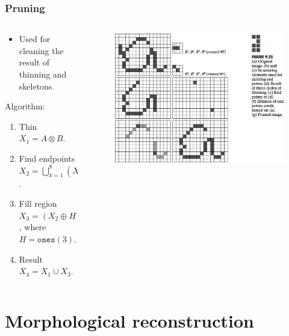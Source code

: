 \begin{frame}
\frametitle{Pruning}
\begin{columns}
\begin{column}{.5\textwidth}
\begin{itemize}
\item Used for cleaning the result of thinning and skeletons.
\end{itemize}
Algorithm:
\begin{enumerate}
\item Thin $X_{1} = A \otimes B$.
\item Find endpoints $X_{2} = \bigcup_{k=1}^{8} (X_{1} \circledast B^{k} )$.
\item Fill region $X_{3} = (X_{2} \oplus H ) \cap A$, where $H = \texttt{ones}(3)$.
\item Result $X_{4} = X_{1} \cup X_{3}$.
\end{enumerate}
\end{column}
\begin{column}{.5\textwidth}
\begin{figure}[!h]
\includegraphics[width=\textwidth]{fig-9-25.png}
\end{figure}
\end{column}
\end{columns}
\end{frame}

\section{Morphological reconstruction}

